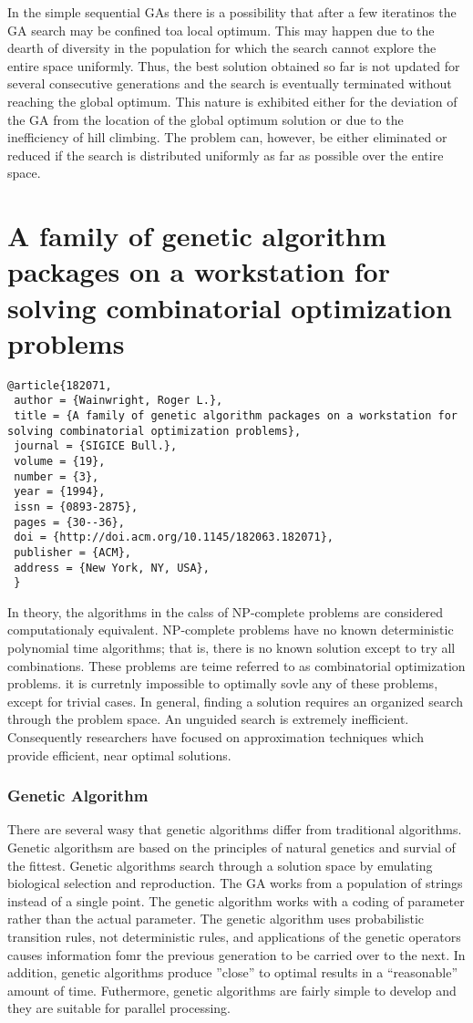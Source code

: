 \documentclass[pdftex,11pt]{article}
\begin{document}
In the simple sequential GAs there is a possibility that after a few iteratinos the GA search may be confined toa local optimum. This may happen due to the dearth of diversity in the population for which the search cannot explore the entire space uniformly. Thus, the best solution obtained so far is not updated for several consecutive generations and the search is eventually terminated without reaching the global optimum. This nature is exhibited either for the deviation of the GA from the location of the global optimum solution or due to the inefficiency of hill climbing. The problem can, however, be either eliminated  or reduced if the search is distributed uniformly as far as possible over the entire space.

\section{A family of genetic algorithm packages on a workstation for solving combinatorial optimization problems}
\begin{verbatim}
@article{182071,
 author = {Wainwright, Roger L.},
 title = {A family of genetic algorithm packages on a workstation for solving combinatorial optimization problems},
 journal = {SIGICE Bull.},
 volume = {19},
 number = {3},
 year = {1994},
 issn = {0893-2875},
 pages = {30--36},
 doi = {http://doi.acm.org/10.1145/182063.182071},
 publisher = {ACM},
 address = {New York, NY, USA},
 }
 \end{verbatim}

In theory, the algorithms in the calss of NP-complete problems are considered computationaly equivalent. NP-complete problems have no known deterministic polynomial time algorithms; that is, there is no known solution except to try all combinations. These problems are teime referred to as combinatorial optimization problems. it is curretnly impossible to optimally sovle any of these problems, except for trivial cases. In general, finding a solution requires an organized search through the problem space. An unguided search is extremely inefficient. Consequently researchers have focused on approximation techniques which provide efficient, near optimal solutions.

\subsubsection{Genetic Algorithm}
There are several wasy that genetic algorithms differ from traditional algorithms. Genetic algorithsm are based on the principles of natural genetics and survial of the fittest. Genetic algorithms search through a solution space by emulating biological selection and reproduction. The GA works from a population of strings instead of a single point. The genetic algorithm works with a coding of parameter rather than the actual parameter. The genetic algorithm uses probabilistic transition rules, not deterministic rules, and applications of the genetic operators causes information fomr the previous generation to be carried over to the next. In addition, genetic algorithms produce ''close'' to optimal results in a ``reasonable'' amount of time. Futhermore, genetic algorithms are fairly simple to develop and they are suitable for parallel processing.
\end{document}
